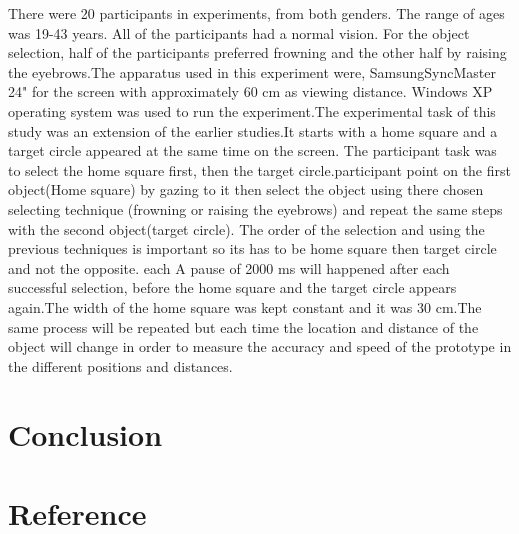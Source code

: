 \documentclass[a4paper]{article}
\begin{document}
There were 20 participants in experiments, from both genders. The range of ages was 19-43 years. All of the participants had a normal vision.
For the object selection, half of the participants preferred frowning and the other half by raising the eyebrows.The apparatus used in this experiment were, SamsungSyncMaster 24" for the screen with approximately 60 cm as viewing distance. Windows XP operating system was used to run the experiment.The experimental task of this study was an extension of the earlier studies.It starts with a home square and a target circle appeared at the same time on the screen. The participant task was to select the home square first, then the target circle.participant point on the first object(Home square) by gazing to it then select the object using there chosen selecting technique (frowning or raising the eyebrows) and repeat the same steps with the second object(target circle). The order of the selection and using the previous techniques is important so its has to be home square then target circle and not the opposite. each A pause of 2000 ms will happened after each successful selection, before the home square and the target circle appears again.The width of the home square was kept constant and it was 30 cm.The same process will be repeated but each time the location and distance of the object will change in order to measure the accuracy and speed of the prototype in the different positions and distances.      
 
\section{Conclusion}



\section{Reference}
\end{document}
